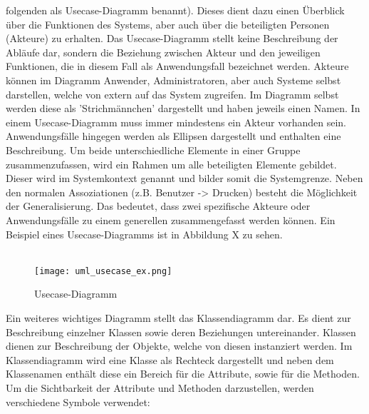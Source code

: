 folgenden als Usecase-Diagramm benannt).  Dieses dient dazu einen Überblick über die Funktionen des Systems, aber auch über die beteiligten Personen (Akteure) zu erhalten. Das Usecase-Diagramm stellt keine Beschreibung der Abläufe dar, sondern die Beziehung zwischen Akteur und den jeweiligen Funktionen, die in diesem Fall als Anwendungsfall bezeichnet werden. Akteure können im Diagramm Anwender, Administratoren, aber auch Systeme selbst darstellen, welche von extern auf das System zugreifen. Im Diagramm selbst werden diese als 'Strichmännchen' dargestellt und haben jeweils einen Namen. In einem Usecase-Diagramm muss immer mindestens ein Akteur vorhanden sein.
Anwendungsfälle hingegen werden als Ellipsen dargestellt und enthalten eine Beschreibung.
Um beide unterschiedliche Elemente in einer Gruppe zusammenzufassen, wird ein Rahmen um alle beteiligten Elemente gebildet.
Dieser wird im Systemkontext genannt und bilder somit die Systemgrenze.
Neben den normalen Assoziationen (z.B. Benutzer -> Drucken) besteht die Möglichkeit der Generalisierung.
Das bedeutet, dass zwei spezifische Akteure oder Anwendungsfälle zu einem generellen zusammengefasst werden können.
Ein Beispiel eines Usecase-Diagramms ist in Abbildung X zu sehen.\\
\\
\begin{figure}[H]
\centering
\texttt{[image: uml\_usecase\_ex.png]}
\caption{Usecase-Diagramm}
\label{fig:show_s1_s2_p1_n1}
\end{figure}
Ein weiteres wichtiges Diagramm stellt das Klassendiagramm dar. Es dient zur Beschreibung einzelner Klassen sowie deren Beziehungen untereinander. Klassen dienen zur Beschreibung der Objekte, welche von diesen instanziert werden. Im Klassendiagramm wird eine Klasse als Rechteck dargestellt und neben dem Klassenamen enthält diese ein Bereich für die Attribute, sowie für die Methoden.
Um die Sichtbarkeit der Attribute und Methoden darzustellen, werden verschiedene Symbole verwendet:\\


